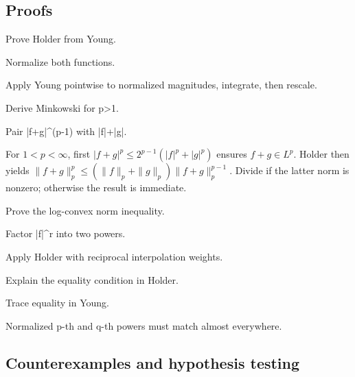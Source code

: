 \subsection*{Proofs}

\begin{exercise}\label{exr:iii07-expand-06}
Prove Holder from Young.
\end{exercise}
\begin{hint}
Normalize both functions.
\end{hint}
\begin{solution}
Apply Young pointwise to normalized magnitudes, integrate, then rescale.
\end{solution}

\begin{exercise}\label{exr:iii07-expand-07}
Derive Minkowski for p>1.
\end{exercise}
\begin{hint}
Pair |f+g|\textasciicircum{}(p-1) with |f|+|g|.
\end{hint}
\begin{solution}
For $1<p<\infty$, first $|f+g|^p\le2^{p-1}(|f|^p+|g|^p)$ ensures $f+g\in L^p$. Holder then yields $\|f+g\|_p^p\le(\|f\|_p+\|g\|_p)\|f+g\|_p^{p-1}$. Divide if the latter norm is nonzero; otherwise the result is immediate.
\end{solution}

\begin{exercise}\label{exr:iii07-expand-08}
Prove the log-convex norm inequality.
\end{exercise}
\begin{hint}
Factor |f|\textasciicircum{}r into two powers.
\end{hint}
\begin{solution}
Apply Holder with reciprocal interpolation weights.
\end{solution}

\begin{exercise}[Equality]\label{exr:iii07-expand-09}
Explain the equality condition in Holder.
\end{exercise}
\begin{hint}
Trace equality in Young.
\end{hint}
\begin{solution}
Normalized p-th and q-th powers must match almost everywhere.
\end{solution}

\subsection*{Counterexamples and hypothesis testing}

